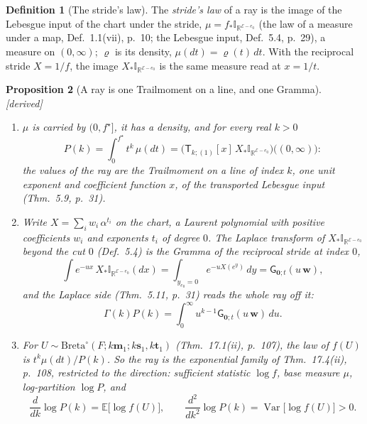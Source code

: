 \documentclass[11pt]{article}
\newcommand{\cE}{\mathcal E}
\newcommand{\mvec}{\mathbf m}
\newcommand{\oE}{\mathbb E}
\newcommand{\sG}{\mathsf G}
\newcommand{\sT}{\mathsf T}
\newcommand{\Lch}{\mathbb I_{\mathbb R^{\cE-e_0}}}
\theoremstyle{plain}
\newtheorem{proposition}{Proposition}[section]
\theoremstyle{definition}
\newtheorem{definition}[proposition]{Definition}
\theoremstyle{remark}
\newcommand{\derived}{\textup{[derived]}}
\begin{document}
\begin{definition}[The stride's law]\label{b:d:law}
The \emph{stride's law} of a ray is the image of the Lebesgue input of the chart under the stride, $\mu=f_*\Lch$ (the law of a measure under a map, Def.~1.1(vii), p.~10; the Lebesgue input, Def.~5.4, p.~29), a measure on $(0,\infty)$; $\varrho$ is its density, $\mu(dt)=\varrho(t)\,dt$. With the reciprocal stride $X=1/f$, the image $X_*\Lch$ is the same measure read at $x=1/t$.
\end{definition}

\begin{proposition}[A ray is one Trailmoment on a line, and one Gramma]\label{b:p:law}\derived\
\begin{enumerate}[label=(\roman*)]
\item $\mu$ is carried by $(0,f^\star]$, it has a density, and for every real $k>0$
\[
P(k)=\int_0^{f^\star}t^k\,\mu(dt)=\big(\sT_{k;(1)}[x]\,X_*\Lch\big)\big((0,\infty)\big):
\]
the values of the ray are the Trailmoment on a line of index $k$, one unit exponent and coefficient function $x$, of the transported Lebesgue input (Thm.~5.9, p.~31).
\item Write $X=\sum_iw_i\,\alpha^{t_i}$ on the chart, a Laurent polynomial with positive coefficients $w_i$ and exponents $t_i$ of degree $0$. The Laplace transform of $X_*\Lch$ beyond the cut $0$ (Def.~5.4) is the Gramma of the reciprocal stride at index $0$,
\[
\int e^{-ux}\,X_*\Lch(dx)=\int_{y_{e_0}=0}e^{-uX(e^y)}\,dy=\sG_{\mathbf 0;t}(u\,\mathbf w),
\]
and the Laplace side (Thm.~5.11, p.~31) reads the whole ray off it:
\[
\Gamma(k)P(k)=\int_0^\infty u^{k-1}\sG_{\mathbf 0;t}(u\,\mathbf w)\,du .
\]
\item For $U\sim\mathrm{Breta}^\circ(F;k\mvec_1;k\mathbf s_1,k\mathbf t_1)$ (Thm.~17.1(ii), p.~107), the law of $f(U)$ is $t^k\mu(dt)/P(k)$. So the ray is the exponential family of Thm.~17.4(ii), p.~108, restricted to the direction: sufficient statistic $\log f$, base measure $\mu$, log-partition $\log P$, and
\[
\frac{d}{dk}\log P(k)=\oE\big[\log f(U)\big],\qquad \frac{d^2}{dk^2}\log P(k)=\operatorname{Var}\big[\log f(U)\big]>0 .
\]
\end{enumerate}
\end{proposition}
\end{document}
